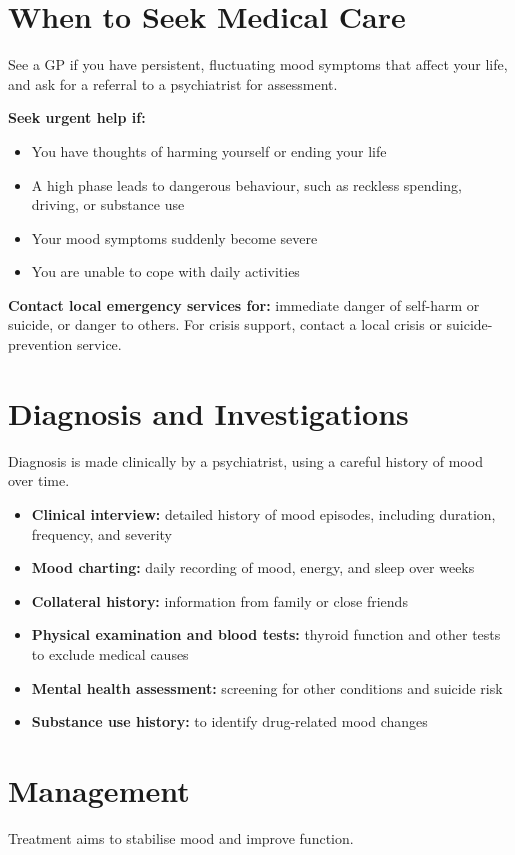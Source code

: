 \section*{When to Seek Medical Care}
See a GP if you have persistent, fluctuating mood symptoms that affect your life, and ask for a referral to a psychiatrist for assessment.

\textbf{Seek urgent help if:}
\begin{itemize}
    \item You have thoughts of harming yourself or ending your life
    \item A high phase leads to dangerous behaviour, such as reckless spending, driving, or substance use
    \item Your mood symptoms suddenly become severe
    \item You are unable to cope with daily activities
\end{itemize}

\textbf{Contact local emergency services for:} immediate danger of self-harm or suicide, or danger to others. For crisis support, contact a local crisis or suicide-prevention service.

\section*{Diagnosis and Investigations}
Diagnosis is made clinically by a psychiatrist, using a careful history of mood over time.

\begin{itemize}
    \item \textbf{Clinical interview:} detailed history of mood episodes, including duration, frequency, and severity
    \item \textbf{Mood charting:} daily recording of mood, energy, and sleep over weeks
    \item \textbf{Collateral history:} information from family or close friends
    \item \textbf{Physical examination and blood tests:} thyroid function and other tests to exclude medical causes
    \item \textbf{Mental health assessment:} screening for other conditions and suicide risk
    \item \textbf{Substance use history:} to identify drug-related mood changes
\end{itemize}

\section*{Management}
Treatment aims to stabilise mood and improve function.

